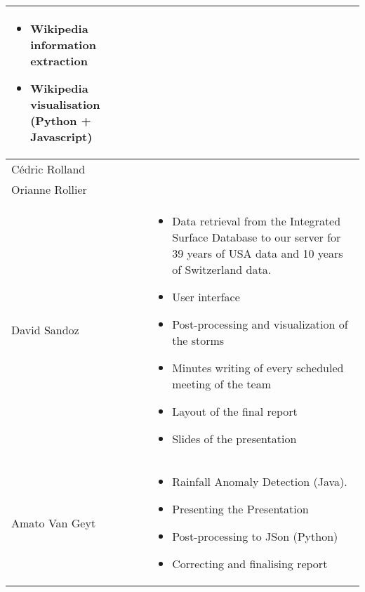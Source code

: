 \begin{longtable}{|l|p{10.5cm}|}
\begin{itemize}
	\item Wikipedia information extraction
	\item Wikipedia visualisation (Python + Javascript)
\end{itemize}\\
\hline
Cédric Rolland &  \\
\hline
Orianne Rollier & \\
\hline
David Sandoz &
\begin{itemize}
	\item Data retrieval from the Integrated Surface Database to our server for 39 years of USA data and 10 years of Switzerland data.
	\item User interface
	\item Post-processing and visualization of the storms
	\item Minutes writing of every scheduled meeting of the team
	\item Layout of the final report
	\item Slides of the presentation
\end{itemize}\\
\hline
Amato Van Geyt & \begin{itemize}
	\item Rainfall Anomaly Detection (Java).
	\item Presenting the Presentation
	\item Post-processing to JSon (Python)
	\item Correcting and finalising report
\end{itemize}\\ 
\hline
\end{longtable}
